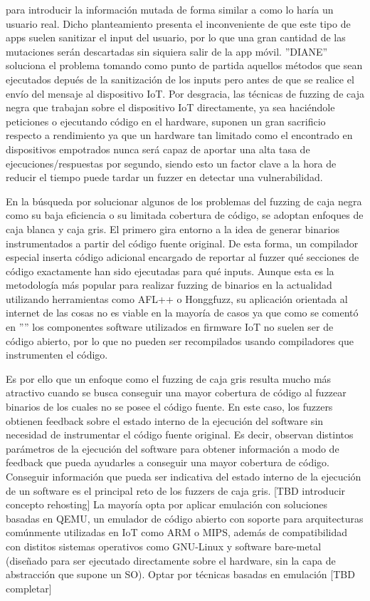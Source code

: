 para introducir la información mutada de forma similar a como lo haría un usuario real. Dicho planteamiento presenta el inconveniente de que este tipo 
de apps suelen sanitizar el input del usuario, por lo que una gran cantidad de las mutaciones serán descartadas sin siquiera salir de la app móvil.
''DIANE'' soluciona el problema tomando como punto de partida aquellos métodos que sean ejecutados depués de la sanitización de los inputs pero antes de
que se realice el envío del mensaje al dispositivo IoT. Por desgracia, las técnicas de fuzzing de caja negra que trabajan sobre el dispositivo IoT
directamente, ya sea haciéndole peticiones o ejecutando código en el hardware, suponen un gran sacrificio respecto a rendimiento ya que un hardware 
tan limitado como el encontrado en dispositivos empotrados nunca será capaz de aportar una alta tasa de ejecuciones/respuestas por segundo, siendo esto un 
factor clave a la hora de reducir el tiempo puede tardar un fuzzer en detectar una vulnerabilidad.

En la búsqueda por solucionar algunos de los problemas del fuzzing de caja negra como su baja eficiencia o su limitada cobertura de código, se 
adoptan enfoques de caja blanca y caja gris. El primero gira entorno a la idea de generar binarios instrumentados a partir del código fuente original. De esta forma, un compilador 
especial inserta código adicional encargado de reportar al fuzzer qué secciones de código exactamente han sido ejecutadas para qué inputs.
Aunque esta es la metodología más popular para realizar fuzzing de binarios en la actualidad utilizando herramientas como AFL++\cite{afl++} o 
Honggfuzz\cite{honggfuzz}, su aplicación orientada al internet de las cosas no es viable en la mayoría de casos ya que como se comentó en 
'''' los componentes software utilizados en firmware IoT no suelen ser de código abierto, por lo que no pueden ser recompilados 
usando compiladores que instrumenten el código.\bigskip

Es por ello que un enfoque como el fuzzing de caja gris resulta mucho más atractivo cuando se busca conseguir una mayor cobertura de código
al fuzzear binarios de los cuales no se posee el código fuente. En este caso, los fuzzers obtienen feedback sobre el estado interno de la ejecución
del software sin necesidad de instrumentar el código fuente original.
Es decir, observan distintos parámetros de la ejecución del software para obtener información a modo de feedback que pueda ayudarles 
a conseguir una mayor cobertura de código. Conseguir información que pueda ser indicativa del estado interno de la ejecución de un software es
el principal reto de los fuzzers de caja gris. [TBD introducir concepto rehosting] La mayoría opta por aplicar emulación con soluciones basadas en QEMU\cite{qemu}, un emulador de código abierto con 
soporte para arquitecturas comúnmente utilizadas en IoT como ARM o MIPS, además de compatibilidad con distitos sistemas operativos como GNU-Linux y 
software bare-metal (diseñado para ser ejecutado directamente sobre el hardware, sin la capa de abstracción que supone un SO). Optar por técnicas 
basadas en emulación [TBD completar]

